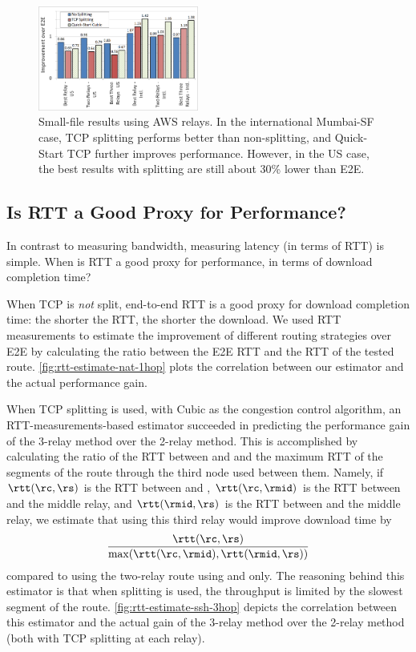 \documentclass[sigconf,usenames,dvipsnames,geometry]{acmart}
\begin{document}
\begin{figure}[t]
  \centering
    \includegraphics[width=0.47\textwidth,trim=2mm 2mm 2mm 2mm,clip]{figures/small_file}
    \caption{Small-file results using AWS relays. In the international Mumbai-SF case, TCP splitting performs better than non-splitting, and Quick-Start TCP further improves performance. However, in the US case, the best  results with splitting are still about 30\% lower than E2E.}
    \label{fig:small-file}
\end{figure}

\subsection{Is RTT a Good Proxy for Performance?}

In contrast to measuring bandwidth, measuring latency (in terms of RTT) is simple. When is RTT a good proxy for performance, in terms of download completion time?

 When TCP is \emph{not} split, end-to-end RTT is a good proxy for download completion time: the shorter the RTT, the shorter the download. We used RTT measurements to estimate the improvement of different routing strategies over E2E by calculating the ratio between the E2E RTT and the RTT of the tested route. \autoref{fig:rtt-estimate-nat-1hop} plots the correlation between our estimator and the actual performance gain. %

 When TCP splitting is used, with Cubic as the congestion control algorithm, an RTT-measurements-based estimator succeeded in predicting the performance gain of the 3-relay method over the 2-relay method. This is accomplished by calculating the ratio of the RTT between \rc and \rs and the maximum RTT of the segments of the route through the third node used between them. Namely, if $\rtt(\rc,\rs)$ is the RTT between \rc and \rs, $\rtt(\rc,\rmid)$ is the RTT between \rc and the middle relay, and $\rtt(\rmid,\rs)$ is the RTT between \rs and the middle relay, we estimate that using this third relay would improve download time by 
\[
\frac{\rtt(\rc,\rs)}{\max(\rtt(\rc,\rmid),\rtt(\rmid,\rs))}
\]
compared to using the two-relay route using \rc and \rs only.
The reasoning behind this estimator is that when splitting is used, the throughput is limited by the slowest segment of the route. \autoref{fig:rtt-estimate-ssh-3hop} depicts the correlation between this estimator and the actual gain of the 3-relay method over the 2-relay method (both with TCP splitting at each relay).
\end{document}
